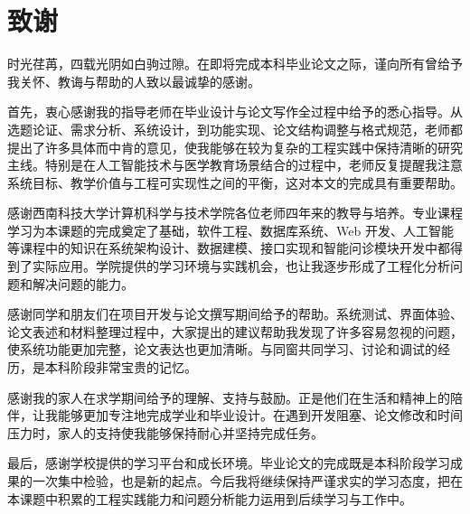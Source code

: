 
\cleardoublepage
\pagestyle{thesisplain}
\chapter*{\centering 致\hspace{2em}谢}

\setlength{\parindent}{2em}
\songti{}

时光荏苒，四载光阴如白驹过隙。在即将完成本科毕业论文之际，谨向所有曾给予我关怀、教诲与帮助的人致以最诚挚的感谢。

首先，衷心感谢我的指导老师在毕业设计与论文写作全过程中给予的悉心指导。从选题论证、需求分析、系统设计，到功能实现、论文结构调整与格式规范，老师都提出了许多具体而中肯的意见，使我能够在较为复杂的工程实践中保持清晰的研究主线。特别是在人工智能技术与医学教育场景结合的过程中，老师反复提醒我注意系统目标、教学价值与工程可实现性之间的平衡，这对本文的完成具有重要帮助。

感谢西南科技大学计算机科学与技术学院各位老师四年来的教导与培养。专业课程学习为本课题的完成奠定了基础，软件工程、数据库系统、Web 开发、人工智能等课程中的知识在系统架构设计、数据建模、接口实现和智能问诊模块开发中都得到了实际应用。学院提供的学习环境与实践机会，也让我逐步形成了工程化分析问题和解决问题的能力。

感谢同学和朋友们在项目开发与论文撰写期间给予的帮助。系统测试、界面体验、论文表述和材料整理过程中，大家提出的建议帮助我发现了许多容易忽视的问题，使系统功能更加完整，论文表达也更加清晰。与同窗共同学习、讨论和调试的经历，是本科阶段非常宝贵的记忆。

感谢我的家人在求学期间给予的理解、支持与鼓励。正是他们在生活和精神上的陪伴，让我能够更加专注地完成学业和毕业设计。在遇到开发阻塞、论文修改和时间压力时，家人的支持使我能够保持耐心并坚持完成任务。

最后，感谢学校提供的学习平台和成长环境。毕业论文的完成既是本科阶段学习成果的一次集中检验，也是新的起点。今后我将继续保持严谨求实的学习态度，把在本课题中积累的工程实践能力和问题分析能力运用到后续学习与工作中。
